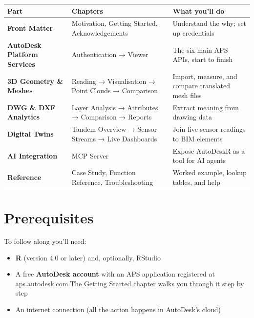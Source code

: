 \documentclass[
  11pt,
  letterpaper,
  DIV=11,
  numbers=noendperiod]{scrreprt}
\providecommand{\tightlist}{%
  \setlength{\itemsep}{0pt}\setlength{\parskip}{0pt}}
\begin{document}
\begin{longtable}[]{@{}
  >{\raggedright\arraybackslash}p{}
  >{\raggedright\arraybackslash}p{}
  >{\raggedright\arraybackslash}p{}@{}}
\toprule\noalign{}
\begin{minipage}[b]{\linewidth}\raggedright
Part
\end{minipage} & \begin{minipage}[b]{\linewidth}\raggedright
Chapters
\end{minipage} & \begin{minipage}[b]{\linewidth}\raggedright
What you'll do
\end{minipage} \\
\midrule\noalign{}
\endhead
\bottomrule\noalign{}
\endlastfoot
\textbf{Front Matter} & Motivation, Getting Started, Acknowledgements &
Understand the why; set up credentials \\
\textbf{AutoDesk Platform Services} & Authentication → Viewer & The six
main APS APIs, start to finish \\
\textbf{3D Geometry \& Meshes} & Reading → Visualisation → Point Clouds
→ Comparison & Import, measure, and compare translated mesh files \\
\textbf{DWG \& DXF Analytics} & Layer Analysis → Attributes → Comparison
→ Reports & Extract meaning from drawing data \\
\textbf{Digital Twins} & Tandem Overview → Sensor Streams → Live
Dashboards & Join live sensor readings to BIM elements \\
\textbf{AI Integration} & MCP Server & Expose AutoDeskR as a tool for AI
agents \\
\textbf{Reference} & Case Study, Function Reference, Troubleshooting &
Worked example, lookup tables, and help \\
\end{longtable}

\section*{Prerequisites}\label{prerequisites}


To follow along you'll need:

\begin{itemize}
\tightlist
\item
  \textbf{R} (version 4.0 or later) and, optionally, RStudio
\item
  A free \textbf{AutoDesk account} with an APS application registered at
  \href{https://aps.autodesk.com}{aps.autodesk.com}.The
  \href{getting-started.qmd}{Getting Started} chapter walks you through
  it step by step
\item
  An internet connection (all the action happens in AutoDesk's cloud)
\end{itemize}
\end{document}

